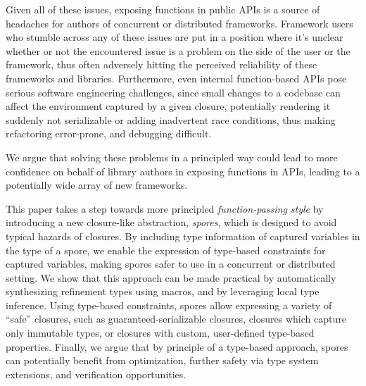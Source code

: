 \documentclass{llncs}
\begin{document}
Given all of these issues, exposing functions in public APIs is a source of
headaches for authors of concurrent or distributed frameworks. Framework users
who stumble across any of these issues are put in a position where it's
unclear whether or not the encountered issue is a problem on the side of the
user or the framework, thus often adversely hitting the perceived reliability
of these frameworks and libraries. Furthermore, even internal
function-based APIs pose serious software engineering challenges, since small
changes to a codebase can affect the environment captured by a given closure,
potentially rendering it suddenly not serializable or adding inadvertent
race conditions, thus making refactoring error-prone, and debugging difficult.

We argue that solving these problems in a principled way could lead to more
confidence on behalf of library authors in exposing functions in APIs, leading
to a potentially wide array of new frameworks.

This paper takes a step towards more principled {\em function-passing style}
by introducing a new closure-like abstraction, {\em spores}, which is designed
to avoid typical hazards of closures. By including type information of
captured variables in the type of a spore, we enable the expression of type-based constraints for captured variables, making spores safer to use in a
concurrent or distributed setting. We show that this approach can be made
practical by automatically synthesizing refinement types using macros, and by
leveraging local type inference. Using type-based constraints, spores allow
expressing a variety of ``safe'' closures, such as guaranteed-serializable
closures, closures which capture only immutable types, or closures with
custom, user-defined type-based properties. Finally, we argue that by
principle of a type-based approach, spores can potentially benefit from optimization, further safety via type system extensions,
and verification opportunities.
\end{document}
